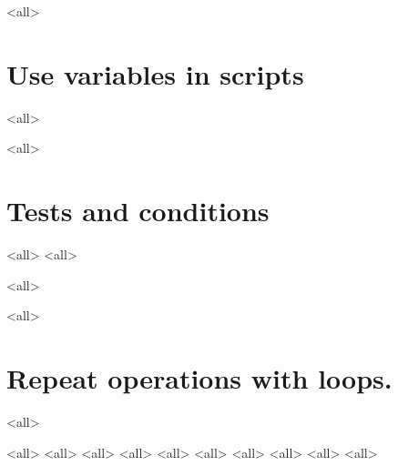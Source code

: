 
\mode<all>{}


\section{Use variables in scripts}
\mode<all>{}

\mode<all>{}

\section{Tests and conditions}

\mode<all>{}
\mode<all>{}

\mode<all>{}



\mode<all>{}




\section{Repeat operations with loops.}
\mode<all>{}


\mode<all>{}
\mode<all>{}
\mode<all>{}
\mode<all>{}
\mode<all>{}
\mode<all>{}
\mode<all>{}
\mode<all>{}
\mode<all>{}
\mode<all>{}
%
